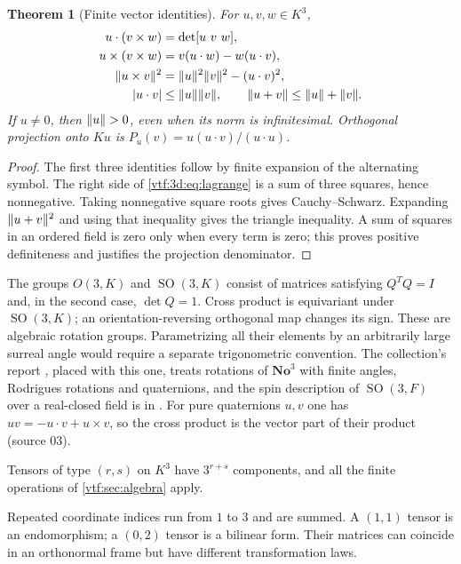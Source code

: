 \documentclass[11pt,letterpaper]{article}
\newtheorem{theorem}{Theorem}[section]
\theoremstyle{definition}
\theoremstyle{remark}
\newcommand{\No}{\mathbf{No}}
\newcommand{\SO}{\operatorname{SO}}\newcommand{\SL}{\operatorname{SL}}
\begin{document}
\begin{theorem}[Finite vector identities]\label{vtf:3d:thm:vector}
For $u,v,w\in K^3$,
\begin{align}
 u\cdot(v\times w)&=\det[u\ v\ w],\label{vtf:3d:eq:triple}\\
 u\times(v\times w)&=v(u\cdot w)-w(u\cdot v),\\
 \lVert u\times v\rVert^2&=\lVert u\rVert^2\lVert v\rVert^2-(u\cdot v)^2,\label{vtf:3d:eq:lagrange}\\
 |u\cdot v|&\leq\lVert u\rVert\lVert v\rVert,\qquad
 \lVert u+v\rVert\leq\lVert u\rVert+\lVert v\rVert.
\end{align}
If $u\ne0$, then $\lVert u\rVert>0$, even when its norm is infinitesimal. Orthogonal projection onto $Ku$ is
$P_u(v)=u(u\cdot v)/(u\cdot u)$.
\end{theorem}
\begin{proof}
The first three identities follow by finite expansion of the alternating symbol. The right side of \eqref{vtf:3d:eq:lagrange} is a sum of three squares, hence nonnegative. Taking nonnegative square roots gives Cauchy--Schwarz. Expanding $\lVert u+v\rVert^2$ and using that inequality gives the triangle inequality. A sum of squares in an ordered field is zero only when every term is zero; this proves positive definiteness and justifies the projection denominator.
\end{proof}

The groups $O(3,K)$ and $\SO(3,K)$ consist of matrices satisfying $Q^TQ=I$ and, in the second case, $\det Q=1$. Cross product is equivariant under $\SO(3,K)$; an orientation-reversing orthogonal map changes its sign. These are algebraic rotation groups. Parametrizing all their elements by an arbitrarily large surreal angle would
require a separate trigonometric convention. The collection's report
, placed with this one, treats rotations
of $\No^3$ with finite angles, Rodrigues rotations and quaternions, and the spin
description of $\SO(3,F)$ over a real-closed field is in
. For pure quaternions $u,v$ one has
$uv=-u\cdot v+u\times v$, so the cross product is the vector part of their
product (source 03).

Tensors of type $(r,s)$ on $K^3$ have $3^{r+s}$ components, and all the finite
operations of \cref{vtf:sec:algebra} apply.

Repeated coordinate indices run from $1$ to $3$ and are summed. A $(1,1)$ tensor is an endomorphism; a $(0,2)$ tensor is a bilinear form. Their matrices can coincide in an orthonormal frame but have different transformation laws.
\end{document}
